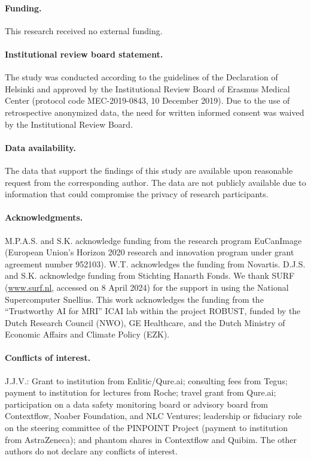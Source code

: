 \paragraph{Funding.}
This research received no external funding.

\paragraph{Institutional review board statement.}
The study was conducted according to the guidelines of the Declaration of Helsinki and approved by the Institutional Review Board of Erasmus Medical Center (protocol code MEC-2019-0843, 10 December 2019).
Due to the use of retrospective anonymized data, the need for written informed consent was waived by the Institutional Review Board.

\paragraph{Data availability.}
The data that support the findings of this study are available upon reasonable request from the corresponding author.
The data are not publicly available due to information that could compromise the privacy of research participants.

\paragraph{Acknowledgments.}
M.P.A.S. and S.K. acknowledge funding from the research program EuCanImage (European Union's Horizon 2020 research and innovation program under grant agreement number 952103).
W.T. acknowledges the funding from Novartis.
D.J.S. and S.K. acknowledge funding from Stichting Hanarth Fonds.
We thank SURF (\url{www.surf.nl}, accessed on 8 April 2024) for the support in using the National Supercomputer Snellius.
This work acknowledges the funding from the ``Trustworthy AI for MRI'' ICAI lab within the project ROBUST, funded by the Dutch Research Council (NWO), GE Healthcare, and the Dutch Ministry of Economic Affairs and Climate Policy (EZK).

\paragraph{Conflicts of interest.}
J.J.V.: Grant to institution from Enlitic/Qure.ai; consulting fees from Tegus; payment to institution for lectures from Roche; travel grant from Qure.ai; participation on a data safety monitoring board or advisory board from Contextflow, Noaber Foundation, and NLC Ventures; leadership or fiduciary role on the steering committee of the PINPOINT Project (payment to institution from AstraZeneca); and phantom shares in Contextflow and Quibim.
The other authors do not declare any conflicts of interest.


